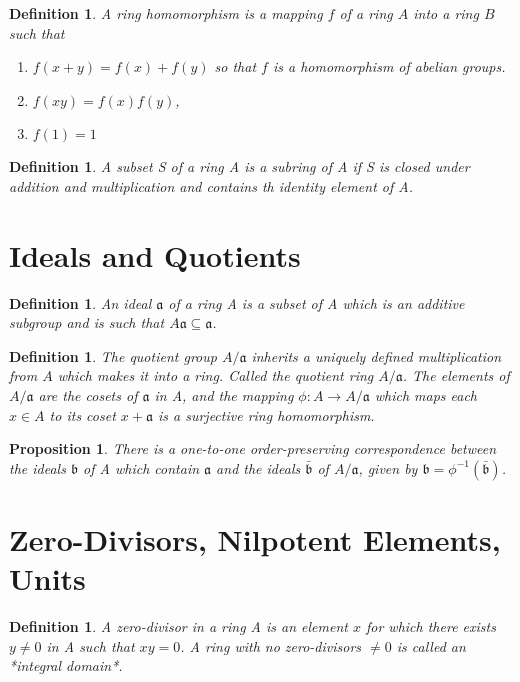 \documentclass[]{report}
\newtheorem{prop}[theorem]{Proposition}
\newtheorem{defn}[theorem]{Definition}
\begin{document}
\begin{defn} A ring homomorphism is a mapping $f$ of a ring $A$ into a ring $B$ such that
    \begin{enumerate}
        \item $f(x+y) = f(x) + f(y)$ so that $f$ is a homomorphism of abelian groups.
        \item $f(xy) = f(x)f(y)$,
        \item $f(1) = 1$
    \end{enumerate}
\end{defn}

\begin{defn} A subset S of a ring A is a subring of A if S is closed under addition and multiplication and contains th identity element of A. 
\end{defn}

\section{Ideals and Quotients}
\begin{defn}
    An ideal $\mathfrak{a}$ of a ring A is a subset of A which is an additive subgroup and is such that $A\mathfrak{a\subseteq a}$.
\end{defn}

\begin{defn}
    The quotient group $A/\mathfrak{a}$ inherits a uniquely defined multiplication from $A$ which makes it into a ring. Called the quotient ring $A/\mathfrak{a}$. The elements of $A/\mathfrak{a}$ are the cosets of $\mathfrak{a}$ in A, and the mapping $\phi: A\rightarrow A/\mathfrak{a}$ which maps each $x\in A$ to its coset $x+\mathfrak{a}$ is a surjective ring homomorphism.
\end{defn}

\begin{prop}
    There is a one-to-one order-preserving correspondence between the ideals $\mathfrak{b}$ of A which contain $\mathfrak{a}$ and the ideals $\bar{\mathfrak{b}}$  of $A/\mathfrak{a}$, given by $\mathfrak{b} = \phi^{-1}(\bar{\mathfrak{b}})$.
\end{prop}

\section{Zero-Divisors, Nilpotent Elements, Units}

\begin{defn}
    A zero-divisor in a ring A is an element $x$ for which there exists $y\neq 0$ in A such that $xy=0$. A ring with no zero-divisors $\neq 0$ is called an *integral domain*.
\end{defn}
\end{document}
